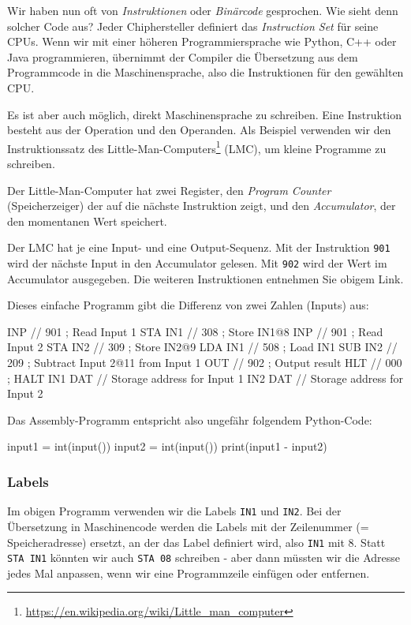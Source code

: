Wir haben nun oft von \emph{Instruktionen} oder \emph{Binärcode} gesprochen. Wie sieht denn solcher Code aus? Jeder Chiphersteller definiert das \emph{Instruction Set} für seine CPUs. Wenn wir mit einer höheren Programmiersprache wie Python, C++ oder Java programmieren, übernimmt der Compiler die Übersetzung aus dem Programmcode in die Maschinensprache, also die Instruktionen für den gewählten CPU.

Es ist aber auch möglich, direkt Maschinensprache zu schreiben. Eine Instruktion besteht aus der Operation und den Operanden. Als Beispiel verwenden wir den Instruktionssatz des Little-Man-Computers\footnote{\url{https://en.wikipedia.org/wiki/Little_man_computer}} (LMC), um kleine Programme zu schreiben.

Der Little-Man-Computer hat zwei Register, den \emph{Program Counter} (Speicherzeiger) der auf die nächste Instruktion zeigt, und den \emph{Accumulator}, der den momentanen Wert speichert.

Der LMC hat je eine Input- und eine Output-Sequenz. Mit der Instruktion \texttt{901} wird der nächste Input in den Accumulator gelesen. Mit \texttt{902} wird der Wert im Accumulator ausgegeben. Die weiteren Instruktionen entnehmen Sie obigem Link.

Dieses einfache Programm gibt die Differenz von zwei Zahlen (Inputs) aus:
\begin{assembly}
    INP     // 901  ; Read Input 1
    STA IN1 // 308  ; Store IN1@8
    INP     // 901  ; Read Input 2
    STA IN2 // 309  ; Store IN2@9
    LDA IN1 // 508  ; Load IN1
    SUB IN2 // 209  ; Subtract Input 2@11 from Input 1
    OUT     // 902  ; Output result
    HLT     // 000  ; HALT
IN1 DAT		// Storage address for Input 1
IN2 DAT		// Storage address for Input 2
\end{assembly}

Das Assembly-Programm entspricht also ungefähr folgendem Python-Code:

\begin{python}
input1 = int(input())
input2 = int(input())
print(input1 - input2)
\end{python}

\subsubsection{Labels}
Im obigen Programm verwenden wir die Labels \texttt{IN1} und \texttt{IN2}. Bei der Übersetzung in Maschinencode werden die Labels mit der Zeilenummer (= Speicheradresse) ersetzt, an der das Label definiert wird, also \texttt{IN1} mit 8. Statt \texttt{STA IN1} könnten wir auch \texttt{STA 08} schreiben - aber dann müssten wir die Adresse jedes Mal anpassen, wenn wir eine Programmzeile einfügen oder entfernen. 


